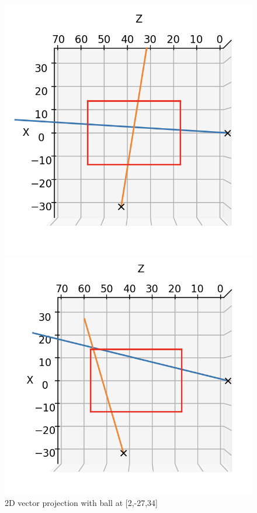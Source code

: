 \documentclass{article}
\begin{document}
\begin{figure}[h!] 
  \label{fig7} 
  \begin{minipage}[b]{0.5\linewidth}
    \centering
    \includegraphics[width=.2\textheight]{11.png} 
    \caption{\label{fig:1}2D vector projection with ball at [2,-27,34]} 
    \vspace{4ex}
  \end{minipage}%
  \begin{minipage}[b]{0.5\linewidth}
    \centering
    \includegraphics[width=.2\textheight]{22.png} 

\end{minipage}
\end{figure}
\end{document}
